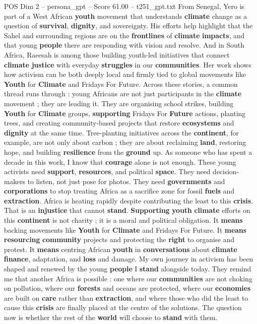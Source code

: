\begin{textsample}{POS Dim 2 – persona\_gpt – Score 61.00 – t251\_gpt.txt}
From Senegal, Yero is part of a West African \textbf{youth} movement that understands \textbf{climate} change as a question of \textbf{survival}, \textbf{dignity}, and sovereignty.
His efforts help highlight that the Sahel and surrounding regions are on the \textbf{frontlines} of \textbf{climate} \textbf{impacts}, and that young \textbf{people} there are responding with vision and resolve.
And in South Africa, Raeesah is among those building youth-led initiatives that connect \textbf{climate} \textbf{justice} with everyday \textbf{struggles} in our \textbf{communities}.
Her work shows how activism can be both deeply local and firmly tied to global movements like \textbf{Youth} for \textbf{Climate} and Fridays For Future.
Across these stories, a common thread runs through : young Africans are not just participants in the \textbf{climate} movement ; they are leading it.
They are organising school strikes, building \textbf{Youth} for \textbf{Climate} groups, \textbf{supporting} Fridays For \textbf{Future} actions, planting trees, and creating community-based projects that restore \textbf{ecosystems} and \textbf{dignity} at the same time.
Tree-planting initiatives across the \textbf{continent}, for example, are not only about carbon ; they are about reclaiming \textbf{land}, restoring hope, and building \textbf{resilience} from the \textbf{ground} up.
As someone who has spent a decade in this work, I know that \textbf{courage} alone is not enough.
These young activists need \textbf{support}, \textbf{resources}, and political \textbf{space}.
They need decision-makers to listen, not just pose for photos.
They need \textbf{governments} and \textbf{corporations} to stop treating Africa as a sacrifice zone for fossil \textbf{fuels} and \textbf{extraction}.
Africa is heating rapidly despite contributing the least to this \textbf{crisis}.
That is an \textbf{injustice} that cannot \textbf{stand}. \textbf{Supporting} \textbf{youth} \textbf{climate} efforts on this \textbf{continent} is not charity ; it is a moral and political obligation.
It \textbf{means} backing movements like \textbf{Youth} for \textbf{Climate} and Fridays For Future.
It \textbf{means} \textbf{resourcing} \textbf{community} projects and protecting the \textbf{right} to organise and protest.
It \textbf{means} centring African \textbf{youth} in \textbf{conversations} about \textbf{climate} \textbf{finance}, adaptation, and \textbf{loss} and damage.
My own journey in activism has been shaped and renewed by the young \textbf{people} I \textbf{stand} alongside today.
They remind me that another Africa is possible : one where our \textbf{communities} are not choking on pollution, where our \textbf{forests} and oceans are protected, where our \textbf{economies} are built on \textbf{care} rather than \textbf{extraction}, and where those who did the least to cause this \textbf{crisis} are finally placed at the centre of the solutions.
The question now is whether the rest of the \textbf{world} will choose to \textbf{stand} with them.


\end{textsample}
